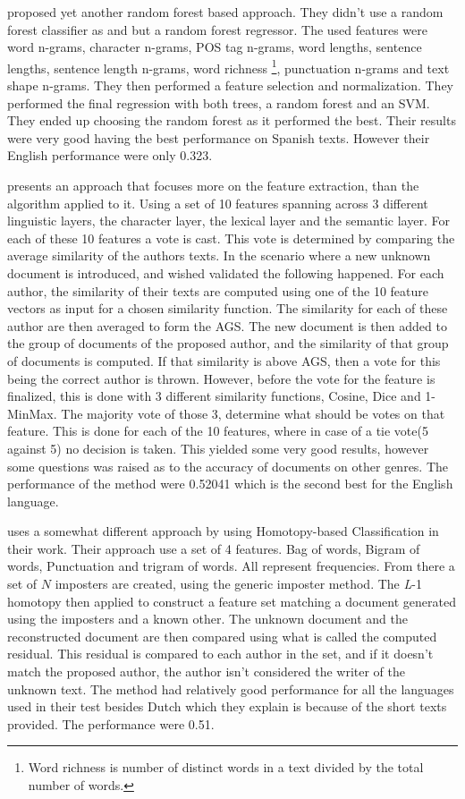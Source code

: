 \cite{bartoli2015b} proposed yet another random forest based approach.
They didn't use a random forest classifier as \cite{maitra2015} and
\cite{pacheco2015} but a random forest regressor. The used features were word
n-grams, character n-grams, \gls{POS} tag n-grams, word lengths, sentence
lengths, sentence length n-grams, word richness \footnote{Word richness is
number of distinct words in a text divided by the total number of words.},
punctuation n-grams and text shape n-grams. They then performed a feature
selection and normalization. They performed the final regression with both
trees, a random forest and an SVM. They ended up choosing the random forest as
it performed the best. Their results were very good having the best performance
on Spanish texts. However their English performance were only 0.323.

\cite{castro2015Paper} presents an approach that focuses more on the feature
extraction, than the algorithm applied to it. Using a set of 10 features
spanning across 3 different linguistic layers, the character layer, the lexical
layer and the semantic layer. For each of these 10 features a vote is cast. This
vote is determined by comparing the average similarity of the authors texts. In
the scenario where a new unknown document is introduced, and wished validated
the following happened. For each author, the similarity of their texts are
computed using one of the 10 feature vectors as input for a chosen similarity
function. The similarity for each of these author are then averaged to form
the \gls{AGS}. The new document is then added to the group of documents of the
proposed author, and the similarity of that group of documents is computed.
If that similarity is above \gls{AGS}, then a vote for this being the correct
author is thrown. However, before the vote for the feature is finalized, this
is done with 3 different similarity functions, Cosine, Dice and 1-MinMax. The
majority vote of those 3, determine what should be votes on that feature. This
is done for each of the 10 features, where in case of a tie vote(5 against 5) no
decision is taken. This yielded some very good results, however some questions
was raised as to the accuracy of documents on other genres. The performance of
the method were 0.52041 which is the second best for the English language.

\cite{gutierrez2015} uses a somewhat different approach by using Homotopy-based
Classification in their work. Their approach use a set of 4 features. Bag
of words, Bigram of words, Punctuation and trigram of words. All represent
frequencies. From there a set of $N$ imposters are created, using the generic
imposter method. The \textit{L}-1 homotopy then applied to construct a feature
set matching a document generated using the imposters and a known other. The
unknown document and the reconstructed document are then compared using what is
called the computed residual. This residual is compared to each author in the
set, and if it doesn't match the proposed author, the author isn't considered
the writer of the unknown text. The method had relatively good performance
for all the languages used in their test besides Dutch which they explain is
because of the short texts provided. The performance were 0.51.

